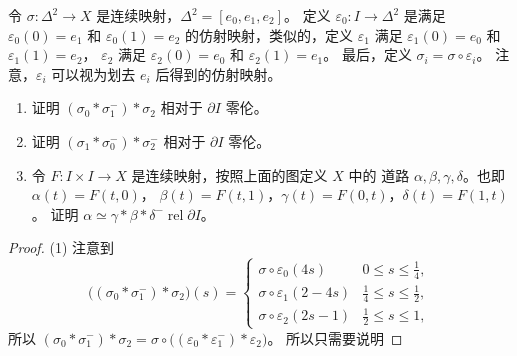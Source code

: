 \documentclass[fontset=none]{Notes}
\DeclareMathOperator\rel{rel}
\newcommand{\partI}{\partial I}
\newcommand{\relhomo}{\rel\partI}
\begin{document}
\begin{problem}{}{}
  令 $\sigma:\Delta^2\to X$ 是连续映射，$\Delta^2=[e_0,e_1,e_2]$。
  定义 $\varepsilon_0:I\to \Delta^2$ 是满足 $\varepsilon_0(0)=e_1$
  和 $\varepsilon_0(1)=e_2$ 的仿射映射，类似的，定义
  $\varepsilon_1$ 满足 $\varepsilon_1(0)=e_0$ 和 $\varepsilon_1(1)=e_2$，
  $\varepsilon_2$ 满足 $\varepsilon_2(0)=e_0$ 和 $\varepsilon_2(1)=e_1$。
  最后，定义 $\sigma_i=\sigma\circ\varepsilon_i$。
  注意，$\varepsilon_i$ 可以视为划去 $e_i$ 后得到的仿射映射。
  \begin{center}
  \end{center}
  \begin{enumerate}
    \item 证明 $(\sigma_0*\sigma_1^-)*\sigma_2$ 相对于 $\partI$ 零伦。
    \item 证明 $(\sigma_1*\sigma_0^-)*\sigma_2^-$ 相对于 $\partI$ 零伦。
    \item 令 $F:I\times I\to X$ 是连续映射，按照上面的图定义 $X$ 中的
    道路 $\alpha,\beta,\gamma,\delta$。也即 $\alpha(t)=F(t,0)$，
    $\beta(t)=F(t,1)$，$\gamma(t)=F(0,t)$，$\delta(t)=F(1,t)$。
    证明 $\alpha\simeq \gamma *\beta *\delta^{-}\relhomo$。
  \end{enumerate}
\end{problem}
\begin{proof}
  (1) 注意到
  \[
    \bigl((\sigma_0*\sigma_1^-)*\sigma_2\bigr)(s)
    =\begin{cases}
      \sigma\circ\varepsilon_0(4s) & 0\leq s\leq \frac{1}{4},\\
      \sigma\circ\varepsilon_1(2-4s) & \frac{1}{4}\leq s\leq \frac{1}{2},\\
      \sigma\circ\varepsilon_2(2s-1) & \frac{1}{2}\leq s\leq 1,
    \end{cases}
  \]
  所以 $(\sigma_0*\sigma_1^-)*\sigma_2=\sigma\circ\bigl((\varepsilon_0*\varepsilon_1^-)*\varepsilon_2\bigr)$。
  所以只需要说明
\end{proof}


 
\end{document}
